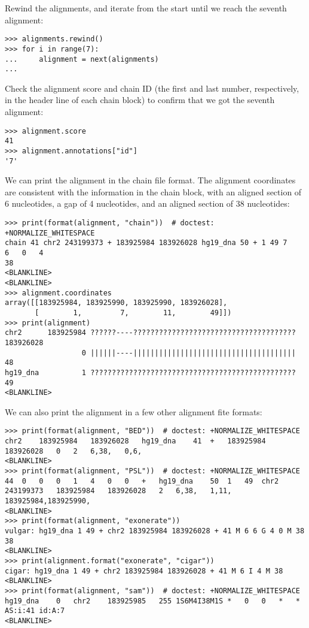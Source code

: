 Rewind the alignments, and iterate from the start until we reach the seventh alignment:
\begin{verbatim}
>>> alignments.rewind()
>>> for i in range(7):
...     alignment = next(alignments)
...
\end{verbatim}
Check the alignment score and chain ID (the first and last number, respectively, in the header line of each chain block) to confirm that we got the seventh alignment:
\begin{verbatim}
>>> alignment.score
41
>>> alignment.annotations["id"]
'7'
\end{verbatim}
We can print the alignment in the chain file format. The alignment coordinates are consistent with the information in the chain block, with an aligned section of 6 nucleotides, a gap of 4 nucleotides, and an aligned section of 38 nucleotides:
\begin{verbatim}
>>> print(format(alignment, "chain"))  # doctest: +NORMALIZE_WHITESPACE
chain 41 chr2 243199373 + 183925984 183926028 hg19_dna 50 + 1 49 7
6	0	4
38
<BLANKLINE>
<BLANKLINE>
>>> alignment.coordinates
array([[183925984, 183925990, 183925990, 183926028],
       [        1,         7,        11,        49]])
>>> print(alignment)
chr2      183925984 ??????----?????????????????????????????????????? 183926028
                  0 ||||||----||||||||||||||||||||||||||||||||||||||        48
hg19_dna          1 ????????????????????????????????????????????????        49
<BLANKLINE>
\end{verbatim}
We can also print the alignment in a few other alignment fite formats:
\begin{verbatim}
>>> print(format(alignment, "BED"))  # doctest: +NORMALIZE_WHITESPACE
chr2	183925984	183926028	hg19_dna	41	+	183925984	183926028	0	2	6,38,	0,6,
<BLANKLINE>
>>> print(format(alignment, "PSL"))  # doctest: +NORMALIZE_WHITESPACE
44	0	0	0	1	4	0	0	+	hg19_dna	50	1	49	chr2	243199373	183925984	183926028	2	6,38,	1,11,	183925984,183925990,
<BLANKLINE>
>>> print(format(alignment, "exonerate"))
vulgar: hg19_dna 1 49 + chr2 183925984 183926028 + 41 M 6 6 G 4 0 M 38 38
<BLANKLINE>
>>> print(alignment.format("exonerate", "cigar"))
cigar: hg19_dna 1 49 + chr2 183925984 183926028 + 41 M 6 I 4 M 38
<BLANKLINE>
>>> print(format(alignment, "sam"))  # doctest: +NORMALIZE_WHITESPACE
hg19_dna	0	chr2	183925985	255	1S6M4I38M1S	*	0	0	*	*	AS:i:41	id:A:7
<BLANKLINE>
\end{verbatim}
